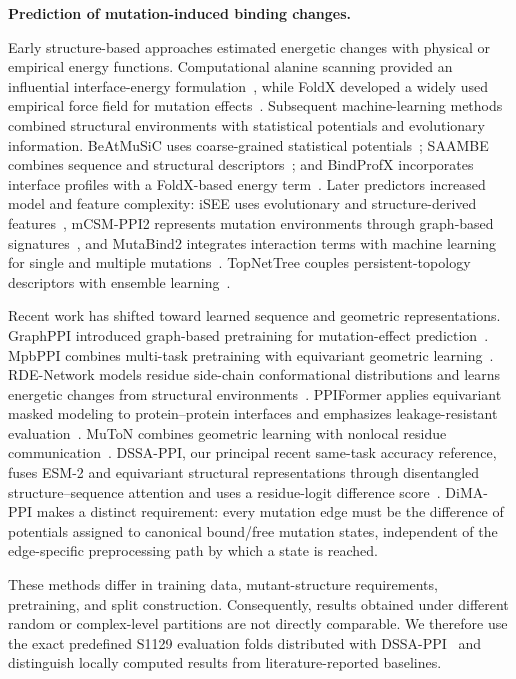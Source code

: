 \documentclass[preprint,12pt]{elsarticle}
\begin{document}
\noindent\textbf{Prediction of mutation-induced binding changes.}

Early structure-based approaches estimated energetic changes with physical or empirical energy functions. Computational alanine scanning provided an influential interface-energy formulation~\cite{kortemme2002}, while FoldX developed a widely used empirical force field for mutation effects~\cite{foldx}. Subsequent machine-learning methods combined structural environments with statistical potentials and evolutionary information. BeAtMuSiC uses coarse-grained statistical potentials~\cite{beatmusic}; SAAMBE combines sequence and structural descriptors~\cite{saambe}; and BindProfX incorporates interface profiles with a FoldX-based energy term~\cite{bindprofx}. Later predictors increased model and feature complexity: iSEE uses evolutionary and structure-derived features~\cite{isee}, mCSM-PPI2 represents mutation environments through graph-based signatures~\cite{mcsmpii2}, and MutaBind2 integrates interaction terms with machine learning for single and multiple mutations~\cite{mutabind2}. TopNetTree couples persistent-topology descriptors with ensemble learning~\cite{topnettree}.

Recent work has shifted toward learned sequence and geometric representations. GraphPPI introduced graph-based pretraining for mutation-effect prediction~\cite{graphppi}. MpbPPI combines multi-task pretraining with equivariant geometric learning~\cite{mpbppi}. RDE-Network models residue side-chain conformational distributions and learns energetic changes from structural environments~\cite{rdenetwork}. PPIFormer applies equivariant masked modeling to protein--protein interfaces and emphasizes leakage-resistant evaluation~\cite{ppiformer}. MuToN combines geometric learning with nonlocal residue communication~\cite{muton}. DSSA-PPI, our principal recent same-task accuracy reference, fuses ESM-2 and equivariant structural representations through disentangled structure--sequence attention and uses a residue-logit difference score~\cite{dssappi}. DiMA-PPI makes a distinct requirement: every mutation edge must be the difference of potentials assigned to canonical bound/free mutation states, independent of the edge-specific preprocessing path by which a state is reached.

These methods differ in training data, mutant-structure requirements, pretraining, and split construction. Consequently, results obtained under different random or complex-level partitions are not directly comparable. We therefore use the exact predefined S1129 evaluation folds distributed with DSSA-PPI~\cite{dssappi} and distinguish locally computed results from literature-reported baselines.
\end{document}
